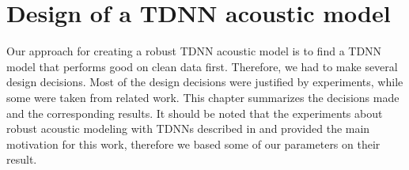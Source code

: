 
\chapter{Design of a TDNN acoustic model}
\label{ch:tdnn_design}
Our approach for creating a robust TDNN acoustic model is to find a TDNN model that performs good on clean data first. Therefore, we had to make several design decisions. Most of the design decisions were justified by experiments, while some were taken from related work. This chapter summarizes the decisions made and the corresponding results. It should be noted that the experiments about robust acoustic modeling with TDNNs described in \cite{peddinti2015jhu} and \cite{peddinti2015reverberation} provided the main motivation for this work, therefore we based some of our parameters on their result.
